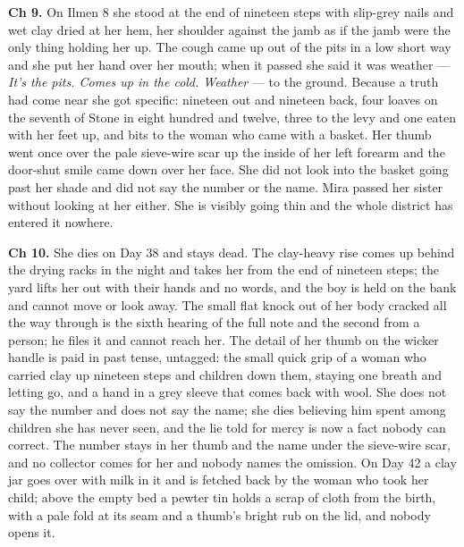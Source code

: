 \documentclass{design/chronicle}
\begin{document}
{\textbf{Ch 9.} On Ilmen 8 she stood at the end of nineteen steps with slip-grey nails and wet clay dried at her hem, her shoulder against the jamb as if the jamb were the only thing holding her up. The cough came up out of the pits in a low short way and she put her hand over her mouth; when it passed she said it was weather --- \emph{It’s the pits. Comes up in the cold. Weather} --- to the ground. Because a truth had come near she got specific: nineteen out and nineteen back, four loaves on the seventh of Stone in eight hundred and twelve, three to the levy and one eaten with her feet up, and bits to the woman who came with a basket. Her thumb went once over the pale sieve-wire scar up the inside of her left forearm and the door-shut smile came down over her face. She did not look into the basket going past her shade and did not say the number or the name. Mira passed her sister without looking at her either. She is visibly going thin and the whole district has entered it nowhere.

\textbf{Ch 10.} She dies on Day 38 and stays dead. The clay-heavy rise comes up behind the drying racks in the night and takes her from the end of nineteen steps; the yard lifts her out with their hands and no words, and the boy is held on the bank and cannot move or look away. The small flat knock out of her body cracked all the way through is the sixth hearing of the full note and the second from a person; he files it and cannot reach her. The detail of her thumb on the wicker handle is paid in past tense, untagged: the small quick grip of a woman who carried clay up nineteen steps and children down them, staying one breath and letting go, and a hand in a grey sleeve that comes back with wool. She does not say the number and does not say the name; she dies believing him spent among children she has never seen, and the lie told for mercy is now a fact nobody can correct. The number stays in her thumb and the name under the sieve-wire scar, and no collector comes for her and nobody names the omission. On Day 42 a clay jar goes over with milk in it and is fetched back by the woman who took her child; above the empty bed a pewter tin holds a scrap of cloth from the birth, with a pale fold at its seam and a thumb’s bright rub on the lid, and nobody opens it.

}
\end{document}
